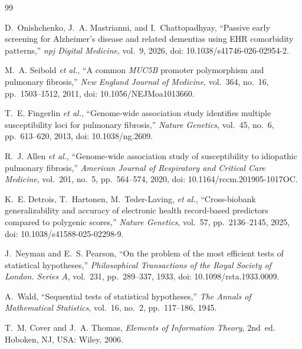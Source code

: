 \documentclass[journal]{IEEEtran}
\begin{document}
\begin{thebibliography}{99}

D.~Onishchenko, J.~A. Mastrianni, and I.~Chattopadhyay,
``Passive early screening for Alzheimer's disease and related dementias using EHR comorbidity patterns,''
\emph{npj Digital Medicine}, vol.~9, 2026, doi: 10.1038/s41746-026-02954-2.

M.~A. Seibold \emph{et al.},
``A common \textit{MUC5B} promoter polymorphism and pulmonary fibrosis,''
\emph{New England Journal of Medicine}, vol.~364, no.~16, pp.~1503--1512, 2011, doi: 10.1056/NEJMoa1013660.

T.~E. Fingerlin \emph{et al.},
``Genome-wide association study identifies multiple susceptibility loci for pulmonary fibrosis,''
\emph{Nature Genetics}, vol.~45, no.~6, pp.~613--620, 2013, doi: 10.1038/ng.2609.

R.~J. Allen \emph{et al.},
``Genome-wide association study of susceptibility to idiopathic pulmonary fibrosis,''
\emph{American Journal of Respiratory and Critical Care Medicine}, vol.~201, no.~5, pp.~564--574, 2020, doi: 10.1164/rccm.201905-1017OC.

K.~E. Detrois, T.~Hartonen, M.~Teder-Laving, \emph{et al.},
``Cross-biobank generalizability and accuracy of electronic health record-based predictors compared to polygenic scores,''
\emph{Nature Genetics}, vol.~57, pp.~2136--2145, 2025, doi: 10.1038/s41588-025-02298-9.

J.~Neyman and E.~S. Pearson,
``On the problem of the most efficient tests of statistical hypotheses,''
\emph{Philosophical Transactions of the Royal Society of London. Series A}, vol.~231, pp.~289--337, 1933, doi: 10.1098/rsta.1933.0009.

A.~Wald,
``Sequential tests of statistical hypotheses,''
\emph{The Annals of Mathematical Statistics}, vol.~16, no.~2, pp.~117--186, 1945.

T.~M. Cover and J.~A. Thomas,
\emph{Elements of Information Theory}, 2nd~ed.
Hoboken, NJ, USA: Wiley, 2006.

\end{thebibliography}
\end{document}
